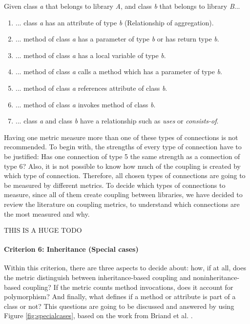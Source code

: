 \documentclass[a4paper]{article}
\begin{document}
Given class \textit{a} that belongs to library \textit{A}, and class \textit{b} that belongs to library \textit{B}...

\begin{enumerate}[noitemsep,leftmargin=*]
  \item ... class \textit{a} has an attribute of type \textit{b} (Relationship of aggregation).
  \item ... method of class \textit{a} has a parameter of type \textit{b} or has return type \textit{b}.
  \item ... method of class \textit{a} has a local variable of type \textit{b}.
  \item ... method of class \textit{a} calls a method which has a parameter of type \textit{b}.
  \item ... method of class \textit{a} references attribute of class \textit{b}.
  \item ... method of class \textit{a} invokes method of class \textit{b}.
  \item ... class \textit{a} and class \textit{b} have a relationship such as \textit{uses} or \textit{consists-of}.
\end{enumerate}

Having one metric measure more than one of these types of connections is not recommended. To begin with, the strengths of every type of connection have to be justified: Has one connection of type 5 the same strength as a connection of type 6? Also, it is not possible to know how much of the coupling is created by which type of connection. Therefore, all chosen types of connections are going to be measured by different metrics. To decide which types of connections to measure, since all of them create coupling between libraries, we have decided to review the literature on coupling metrics, to understand which connections are the most measured and why.

THIS IS A HUGE TODO

\paragraph{Criterion 6: Inheritance (Special cases)}
Within this criterion, there are three aspects to decide about: how, if at all, does the metric distinguish between inheritance-based coupling and noninheritance-based coupling? If the metric counts method invocations, does it account for polymorphism? And finally, what defines if a method or attribute is part of a class or not? This questions are going to be discussed and answered by using Figure \ref{fig:specialcases}, based on the work from Briand et al. \cite{briand1999unified}.
\end{document}
